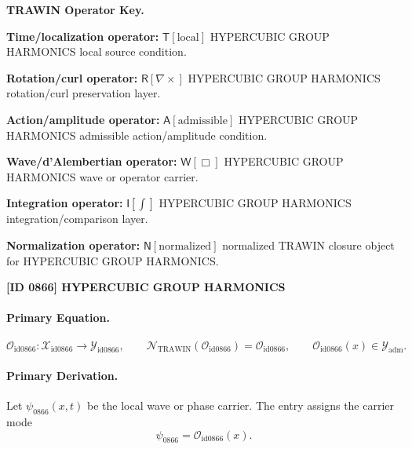 \par\vspace{0.45\baselineskip}
\noindent\begin{minipage}[t]{\linewidth}
\begingroup
\small
\raggedright
\textbf{TRAWIN Operator Key.}\par
\noindent\textbf{Time/localization operator:} $\mathsf{T}\!\left[\mathrm{local}\right]$ HYPERCUBIC GROUP HARMONICS local source condition.\par
\noindent\textbf{Rotation/curl operator:} $\mathsf{R}\!\left[\nabla\times\right]$ HYPERCUBIC GROUP HARMONICS rotation/curl preservation layer.\par
\noindent\textbf{Action/amplitude operator:} $\mathsf{A}\!\left[\mathrm{admissible}\right]$ HYPERCUBIC GROUP HARMONICS admissible action/amplitude condition.\par
\noindent\textbf{Wave/d'Alembertian operator:} $\mathsf{W}\!\left[\Box\right]$ HYPERCUBIC GROUP HARMONICS wave or operator carrier.\par
\noindent\textbf{Integration operator:} $\mathsf{I}\!\left[\int\right]$ HYPERCUBIC GROUP HARMONICS integration/comparison layer.\par
\noindent\textbf{Normalization operator:} $\mathsf{N}\!\left[\mathrm{normalized}\right]$ normalized TRAWIN closure object for HYPERCUBIC GROUP HARMONICS.\par
\endgroup
\end{minipage}

\clearpage
\noindent\textbf{[ID 0866] HYPERCUBIC GROUP HARMONICS}\par
\vspace{0.35em}
\paragraph{Primary Equation.}
\[
\mathcal{O}_{\mathrm{id0866}}:\mathcal{X}_{\mathrm{id0866}}\longrightarrow \mathcal{Y}_{\mathrm{id0866}},\qquad
\mathcal{N}_{\mathrm{TRAWIN}}(\mathcal{O}_{\mathrm{id0866}})=\mathcal{O}_{\mathrm{id0866}},\qquad
\mathcal{O}_{\mathrm{id0866}}(x)\in\mathcal{Y}_{\mathrm{adm}}.
\]

\paragraph{Primary Derivation.} Let $\psi_{0866}(x,t)$ be the local wave or phase carrier.  The entry assigns the carrier mode\[
\psi_{0866}=\mathcal{O}_{\mathrm{id0866}}(x).
\]

